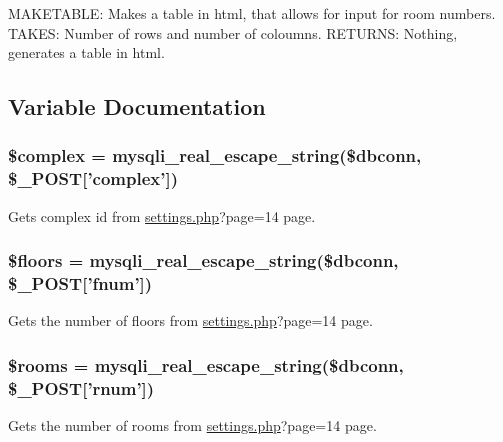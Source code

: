 \begin{DoxyPre}
 MAKETABLE: Makes a table in html, that allows for input for room numbers. 
 TAKES: Number of rows and number of coloumns.
 RETURNS: Nothing, generates a table in html. 
\end{DoxyPre}
 

\subsection{\-Variable \-Documentation}
\hypertarget{makeRoomTable_8php_a25ec02534214977602829622b78b5d78}{
\subsubsection[{\$complex}]{\setlength{\rightskip}{0pt plus 5cm}\$complex = mysqli\-\_\-real\-\_\-escape\-\_\-string(\$dbconn, \$\-\_\-\-P\-O\-S\-T\mbox{[}'complex'\mbox{]})}}\label{makeRoomTable_8php_a25ec02534214977602829622b78b5d78}
\-Gets complex id from \hyperlink{settings_8php}{settings.\-php}?page=14 page. \hypertarget{makeRoomTable_8php_aa0d74edae4412a4ad5a1b0537ada5ecc}{
\subsubsection[{\$floors}]{\setlength{\rightskip}{0pt plus 5cm}\$floors = mysqli\-\_\-real\-\_\-escape\-\_\-string(\$dbconn, \$\-\_\-\-P\-O\-S\-T\mbox{[}'fnum'\mbox{]})}}\label{makeRoomTable_8php_aa0d74edae4412a4ad5a1b0537ada5ecc}
\-Gets the number of floors from \hyperlink{settings_8php}{settings.\-php}?page=14 page. \hypertarget{makeRoomTable_8php_a7885060478f8025f87d356f715f7b776}{
\subsubsection[{\$rooms}]{\setlength{\rightskip}{0pt plus 5cm}\$rooms = mysqli\-\_\-real\-\_\-escape\-\_\-string(\$dbconn, \$\-\_\-\-P\-O\-S\-T\mbox{[}'rnum'\mbox{]})}}\label{makeRoomTable_8php_a7885060478f8025f87d356f715f7b776}
\-Gets the number of rooms from \hyperlink{settings_8php}{settings.\-php}?page=14 page. 
